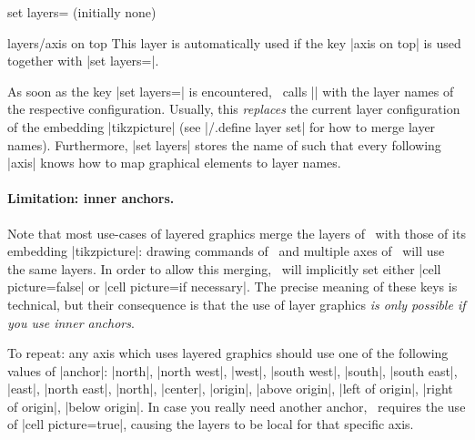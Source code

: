 {\begin{pgfplotskey}{set layers= (initially none)}
\begin{pgfplotskey}{layers/axis on top}
	This layer is automatically used if the key |axis on top| is used together with |set layers=|.
   \end{pgfplotskey}
  	
	As soon as the key |set layers=| is encountered, \PGFPlots\ calls |\pgfsetlayers| with the layer names of the respective configuration. Usually, this \emph{replaces} the current layer configuration of the embedding |tikzpicture| (see |/.define layer set| for how to merge layer names). Furthermore, |set layers| stores the name of  such that every following |axis| knows how to map graphical elements to layer names.
	

    \paragraph{Limitation: inner anchors.} Note that most use-cases of layered graphics merge the layers of \PGFPlots\ with those of its embedding |tikzpicture|: drawing commands of \Tikz\ and multiple axes of \PGFPlots\ will use the same layers. In order to allow this merging, \PGFPlots\ will implicitly set either |cell picture=false| or |cell picture=if necessary|. The precise meaning of these keys is technical, but their consequence is that the use of layer graphics \emph{is only possible if you use inner anchors}. 

    To repeat: any axis which uses layered graphics should use one of the following values of |anchor|: |north|, |north west|, |west|, |south west|, |south|, |south east|, |east|, |north east|, |north|, |center|, |origin|, |above origin|, |left of origin|, |right of origin|, |below origin|. In case you really need another anchor, \PGFPlots\ requires the use of |cell picture=true|, causing the layers to be local for that specific axis.


\end{pgfplotskey}}
